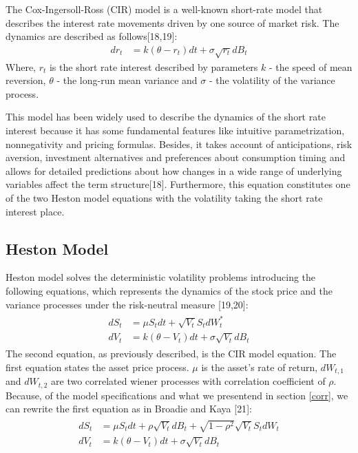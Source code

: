 \documentclass[12pt,twoside]{reedthesis}
\theoremstyle{definition}
\theoremstyle{definition}
\theoremstyle{remark}
\begin{document}
  The Cox-Ingersoll-Ross (CIR) model is a well-known short-rate model that
  describes the interest rate movements driven by one source of market
  risk. The dynamics are described as follows{[}18,19{]}:
  \begin{align}
  \label{eq:cir}
  dr_t &= k(\theta - r_t)dt + \sigma \sqrt{r_t} dB_t
  \end{align}
  \noindent
  Where, \(r_t\) is the short rate interest described by parameters \(k\)
  - the speed of mean reversion, \(\theta\) - the long-run mean variance
  and \(\sigma\) - the volatility of the variance process.
  
  This model has been widely used to describe the dynamics of the short
  rate interest because it has some fundamental features like intuitive
  parametrization, nonnegativity and pricing formulas. Besides, it takes
  account of anticipations, risk aversion, investment alternatives and
  preferences about consumption timing and allows for detailed predictions
  about how changes in a wide range of underlying variables affect the
  term structure{[}18{]}. Furthermore, this equation constitutes one of
  the two Heston model equations with the volatility taking the short rate
  interest place.
  
  \subsection{Heston Model}\label{heston-model}
  
  Heston model solves the deterministic volatility problems introducing
  the following equations, which represents the dynamics of the stock
  price and the variance processes under the risk-neutral measure
  {[}19,20{]}:
  \begin{align}
  \label{eq:heston}
  \begin{split}
  dS_t &= \mu S_t dt + \sqrt{V_t} S_t dW^*_t \\
  dV_t &= k(\theta - V_t)dt + \sigma \sqrt{V_t} dB_t
  \end{split}
  \end{align}
  The second equation, as previously described, is the CIR model equation.
  The first equation states the asset price process. \(\mu\) is the
  asset's rate of return, \(dW_{t,1}\) and \(dW_{t,2}\) are two correlated
  wiener processes with correlation coefficient of \(\rho\). Because, of
  the model specifications and what we presentend in section \ref{corr},
  we can rewrite the first equation as in Broadie and Kaya {[}21{]}:
  \begin{align}
  \label{eq:heston2}
  \begin{split}
  dS_t &= \mu S_t dt + \rho \sqrt{V_t} dB_t + \sqrt{1 - \rho^2} \sqrt{V_t} S_t dW_t \\
  dV_t &= k(\theta - V_t)dt + \sigma \sqrt{V_t} dB_t
  \end{split}
  \end{align}
\end{document}
